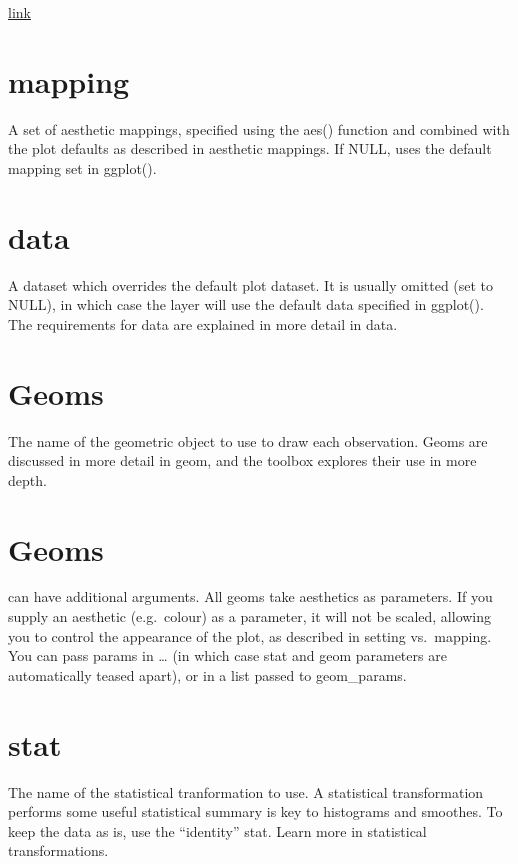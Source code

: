 \documentclass[
]{book}
\theoremstyle{definition}
\theoremstyle{definition}
\theoremstyle{definition}
\theoremstyle{definition}
\theoremstyle{remark}
\begin{document}
\href{https://rpubs.com/hadley/ggplot2-layers}{link}

\hypertarget{mapping}{%
\section{mapping}\label{mapping}}

A set of aesthetic mappings, specified using the aes() function and combined with the plot defaults as described in aesthetic mappings. If NULL, uses the default mapping set in ggplot().

\hypertarget{data}{%
\section{data}\label{data}}

A dataset which overrides the default plot dataset. It is usually omitted (set to NULL), in which case the layer will use the default data specified in ggplot(). The requirements for data are explained in more detail in data.

\hypertarget{geoms}{%
\section{Geoms}\label{geoms}}

The name of the geometric object to use to draw each observation. Geoms are discussed in more detail in geom, and the toolbox explores their use in more depth.

\hypertarget{geoms-1}{%
\section{Geoms}\label{geoms-1}}

can have additional arguments. All geoms take aesthetics as parameters. If you supply an aesthetic (e.g.~colour) as a parameter, it will not be scaled, allowing you to control the appearance of the plot, as described in setting vs.~mapping. You can pass params in \ldots{} (in which case stat and geom parameters are automatically teased apart), or in a list passed to geom\_params.

\hypertarget{stat}{%
\section{stat}\label{stat}}

The name of the statistical tranformation to use. A statistical transformation performs some useful statistical summary is key to histograms and smoothes. To keep the data as is, use the ``identity'' stat. Learn more in statistical transformations.
\end{document}
